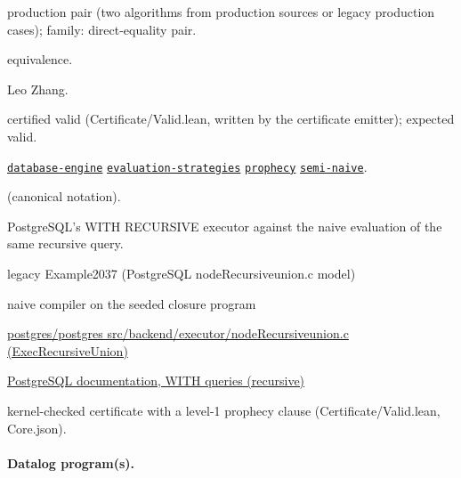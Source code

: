 \documentclass[10pt]{article}
\begin{document}
\begin{description}[leftmargin=2.6cm,style=nextline,itemsep=1pt]

\item[Category] production pair (two algorithms from production sources or legacy production cases); family: direct-equality pair.

\item[Kind] equivalence.

\item[Contributors] Leo Zhang.

\item[Status] certified valid (Certificate/Valid.lean, written by the certificate emitter); expected valid.

\item[Tags] \hyperref[tag:database-engine]{\texttt{database-engine}} \hyperref[tag:evaluation-strategies]{\texttt{evaluation-strategies}} \hyperref[tag:prophecy]{\texttt{prophecy}} \hyperref[tag:semi-naive]{\texttt{semi-naive}}.

\item[Input]  (canonical notation).

\item[Summary] PostgreSQL's WITH RECURSIVE executor against the naive evaluation of the same recursive query.

\item[Sides] legacy Example2037 (PostgreSQL nodeRecursiveunion.c model) \par naive compiler on the seeded closure program

\item[Sources] {\raggedright \href{https://github.com/postgres/postgres/blob/master/src/backend/executor/nodeRecursiveunion.c}{postgres/postgres src/backend/executor/nodeRecursiveunion.c (ExecRecursiveUnion)} \par \href{https://www.postgresql.org/docs/current/queries-with.html}{PostgreSQL documentation, WITH queries (recursive)}\par}

\item[Prophecy] kernel-checked certificate with a level-1 prophecy clause (Certificate/Valid.lean, Core.json).

\end{description}

\paragraph{Datalog program(s).}
\end{document}
